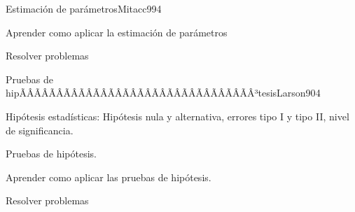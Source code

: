 \begin{sumilla}
\begin{unit}{Estimaci\'on de par\'ametros}{Mitacc99}{4}
   \begin{objetivos}
         \item  Aprender como aplicar la estimaci\'on de par\'ametros
         \item  Resolver problemas
   \end{objetivos}
\end{unit}

\begin{unit}{Pruebas de hipÃÂÃÂÃÂÃÂÃÂÃÂÃÂÃÂÃÂÃÂÃÂÃÂÃÂÃÂÃÂÃÂ³tesis}{Larson90}{4}
   \begin{topicos}
         \item  Hip\'otesis estad\'isticas: Hip\'otesis nula y alternativa, errores tipo I y tipo II, nivel de significancia.
	 \item  Pruebas de hip\'otesis.
   \end{topicos}

   \begin{objetivos}
         \item  Aprender como aplicar las pruebas de hip\'otesis.
         \item  Resolver problemas
   \end{objetivos}
\end{unit}

\begin{bibliografia}
\end{bibliografia}

\end{sumilla}


